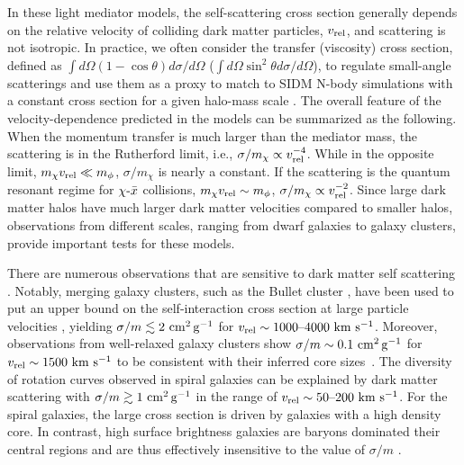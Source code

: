 In these light mediator models, the self-scattering cross section generally depends on the relative velocity of colliding dark matter particles, $v_{\rm rel}$, and scattering is not isotropic. In practice, we often consider the transfer (viscosity) cross section, defined as $\int d\Omega(1-\cos\theta)d\sigma/d\Omega$ ($\int d\Omega\sin^2\theta d\sigma/d\Omega$), to regulate small-angle scatterings and use them as a proxy to match to SIDM N-body simulations with a constant cross section for a given halo-mass scale \citep[see][]{Tulin:2013teo,Kahlhoefer:2013dca}. The overall feature of the velocity-dependence predicted in the models can be summarized as the following. When the momentum transfer is much larger than the mediator mass, the scattering is in the Rutherford limit, i.e., $\sigma/m_\chi\propto v^{-4}_{\rm rel}$. While in the opposite limit, $m_\chi v_{\rm rel}\ll m_\phi$, $\sigma/m_\chi$ is nearly a constant. If the scattering is the quantum resonant regime for $\chi\textup{-}\bar{x}$ collisions, $m_\chi v_{\rm rel}\sim m_\phi$, $\sigma/m_\chi\propto v^{-2}_{\rm rel}$. Since large dark matter halos have much larger dark matter velocities compared to smaller halos, observations from different scales, ranging from dwarf galaxies to galaxy clusters, provide important tests for these models.


There are numerous observations that are sensitive to dark matter self scattering \citep[\eg,  Table 1 in][]{Tulin:2017ara}. Notably, merging galaxy clusters, such as the Bullet cluster  \citep{Randall:2007ph,Robertson17BC}, have been used to put an upper bound on the self-interaction cross section at large particle velocities \citep[see,\eg][]{Kahlhoefer:2013dca,Kahlhoefer:2015vua,Kim:2016ujt,Harvey:2016bqd,Robertson:2016qef,Wittman:2017gxn}, yielding $\sigma/m\lesssim 2 \mathrm{\,\mathrm{\,cm}^2\mathrm{\,g}^{-1}}$ for $v_{\rm rel}\sim 1000\textup{--}4000 \mathrm{\,\mathrm{\,km}\,\mathrm{\,s}^{-1}}$. Moreover, observations from well-relaxed galaxy clusters \citep{Newman++11,Newman++13a,Newman++13b} show $\sigma/m \sim 0.1 \mathrm{\,\mathrm{\,cm}^2\mathrm{\,g}^{-1}}$ for $v_{\rm rel} \sim 1500 \mathrm{\,\mathrm{\,km}\,\mathrm{\,s}^{-1}}$ to be consistent with their inferred core sizes~\citep{Kaplinghat:2015aga,Andrade:2019wzn}. The diversity of rotation curves observed in spiral galaxies can be explained by dark matter scattering with $\sigma/m\gtrsim 1 \mathrm{\,\mathrm{\,cm}^2\mathrm{\,g}^{-1}}$ in the range of $v_{\rm rel}\sim50\textup{--}200 \mathrm{\,\mathrm{\,km}\,\mathrm{\,s}^{-1}}$. For the spiral galaxies, the large cross section is driven by galaxies with a high density core. In contrast, high surface brightness galaxies are baryons dominated their central regions and are thus effectively insensitive to the value of $\sigma/m$ \citep{Kamada:2016euw,Ren:2018jpt}. 

